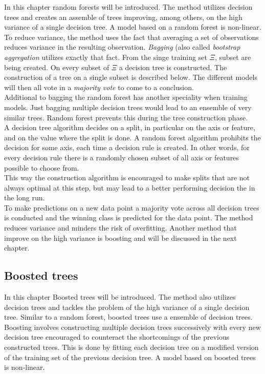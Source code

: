 In this chapter random forests will be introduced. The method utilizes decision trees and creates an assemble of trees improving, among others, on the high variance of a single decision tree. 
A model based on a random forest is non-linear.
\\
To reduce variance, the method uses the fact that averaging a set of observations reduces variance in the resulting observation.
\emph{Bagging} (also called \emph{bootstrap aggregation} utilizes exactly that fact. From the singe training set $\Xi$, subset are being created. On every subset of $\Xi$ a decision tree is constructed. The construction of a tree on a single subset is described below. The different models will then all vote in a \emph{majority vote} to come to a conclusion.
\\
Additional to bagging the random forest has another speciality when training models. Just bagging multiple decision trees would lead to an ensemble of very similar trees. Random forest prevents this during the tree construction phase.
\\
 A decision tree algorithm decides on a split, in particular on the axis or feature, and on the value where the split is done. A random forest algorithm prohibits the decision for some axis, each time a decision rule is created. In other words, for every decision rule there is a randomly chosen subset of all axis or features possible to choose from.\\
This way the construction algorithm is encouraged to make splits that are not always optimal at this step, but may lead to a better performing decision the in the long run.
\\
To make predictions on a new data point  a majority vote across all decision trees is conducted and the winning class is predicted for the data point.
The method reduces variance and minders the risk of overfitting. Another method that improve on the high variance is boosting and will be discussed in the next chapter. \cite{Breiman2001}

\subsection{Boosted trees}

In this chapter Boosted trees will be introduced. The method also utilizes decision trees and tackles the problem of the high variance of a single decision tree. 
Similar to a random forest, boosted trees use a ensemble of decision trees. Boosting involves constructing multiple decision trees successively with every new decision tree encouraged to counteract the shortcomings of the previous constructed trees. This is done by fitting each decision tree on a modified version of the training set of the previous decision tree.
A model based on boosted trees is non-linear.
\\

